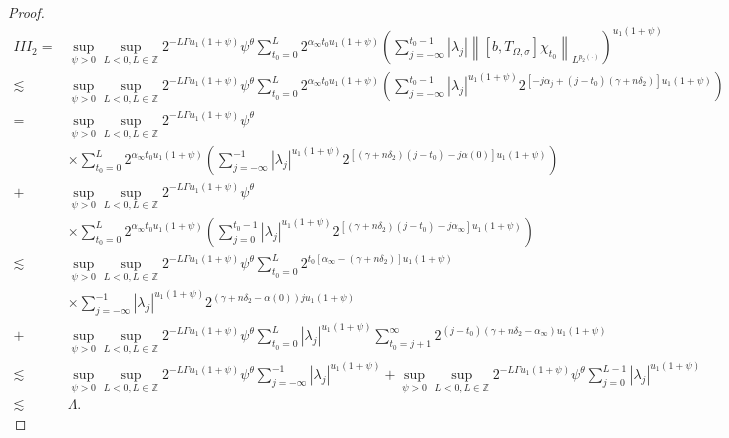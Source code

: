 \documentclass[oneside,reqno]{amsart}
\numberwithin{equation}{section}
\theoremstyle{definition}
\begin{document}
\begin{proof}
\begin{align*}
I I I_{2}= & \sup_{\psi>0}\sup _{L <  0, L \in \mathbb{Z}} 2^{-L \Gamma u_1(1+\psi)} \psi^\theta \sum_{t_0=0}^{L} 2^{\alpha_{\infty} t_0u _1(1+\psi)}\left(\sum_{j=-\infty}^{t_0-1}\left|\lambda_{j}\right|\left\|\left[b, T_{\Omega, \sigma}\right] \chi_{t_0}\right\|_{L^{p_2(\cdot)}}\right)^{u_1(1+\psi)} \\
\lesssim & \sup_{\psi>0}\sup _{L <  0, L \in \mathbb{Z}} 2^{-L \Gamma u_1(1+\psi)} \psi^\theta  \sum_{t_0=0}^{L} 2^{\alpha_{\infty} t_0u _1(1+\psi)}\left(\sum_{j=-\infty}^{t_0-1}\left|\lambda_{j}\right|^{u_1(1+\psi)} 2^{[-j \alpha_j +(j-t_0)(\gamma+n\delta_2)] u_1(1+\psi)}\right) \\
= & \sup_{\psi>0}\sup _{L <  0, L \in \mathbb{Z}} 2^{-L \Gamma u_1(1+\psi)} \psi^\theta\\
& \times \sum_{t_0=0}^{L} 2^{\alpha_{\infty} t_0u _1(1+\psi)}\left(\sum_{j=-\infty}^{-1}\left|\lambda_{j}\right|^{u_1(1+\psi)} 2^{\left[(\gamma+n\delta_2)(j-t_0)-j \alpha(0)\right] u_1(1+\psi)}\right) \\
+& \sup_{\psi>0}\sup _{L <  0, L \in \mathbb{Z}} 2^{-L \Gamma u_1(1+\psi)} \psi^\theta \\
& \times \sum_{t_0=0}^{L} 2^{\alpha_{\infty} t_0u _1(1+\psi)}\left(\sum_{j=0}^{t_0-1}\left|\lambda_{j}\right|^{u_1(1+\psi)} 2^{\left[(\gamma+n\delta_2)(j-t_0)-j \alpha_{\infty}\right] u_1(1+\psi)}\right)\\
\lesssim & \sup_{\psi>0}\sup _{L <  0, L \in \mathbb{Z}} 2^{-L \Gamma u_1(1+\psi)} \psi^\theta \sum_{t_0=0}^{L} 2^{t_0\left[\alpha_{\infty}-(\gamma+n\delta_2)\right]  u_1(1+\psi)} \\
& \times \sum_{j=-\infty}^{-1}\left|\lambda_{j}\right|^{u_1(1+\psi)} 2^{\left(\gamma+n\delta_2-\alpha(0)\right) j u_1(1+\psi)} \\
+& \sup_{\psi>0}\sup _{L <  0, L \in \mathbb{Z}} 2^{-L \Gamma u_1(1+\psi)} \psi^\theta \sum_{t_0=0}^{L}\left|\lambda_{j}\right|^{u_1(1+\psi)} \sum_{t_0=j+1}^{\infty} 2^{(j-t_0)\left(\gamma+n\delta_2-\alpha_{\infty}\right) u_1(1+\psi)} \\
\lesssim & \sup_{\psi>0}\sup _{L <  0, L \in \mathbb{Z}} 2^{-L \Gamma u_1(1+\psi)} \psi^\theta \sum_{j=-\infty}^{-1}\left|\lambda_{j}\right|^{u_1(1+\psi)}+\sup_{\psi>0}\sup _{L <  0, L \in \mathbb{Z}} 2^{-L \Gamma u_1(1+\psi)} \psi^\theta \sum_{j=0}^{L-1}\left|\lambda_{j}\right|^{u_1(1+\psi)} \\
\lesssim & \Lambda .
\end{align*}






\end{proof}
\end{document}
